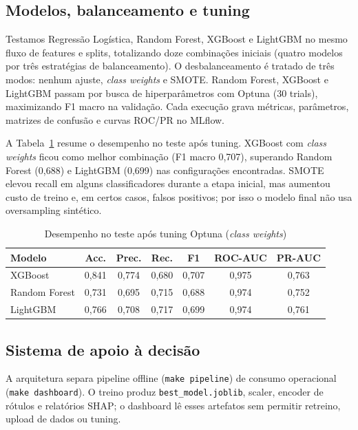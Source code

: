 \documentclass[12pt]{article}
\begin{document}
\subsection{Modelos, balanceamento e tuning}

Testamos Regressão Logística, Random Forest, XGBoost e LightGBM no mesmo fluxo de features e splits, totalizando doze combinações iniciais (quatro modelos por três estratégias de balanceamento).
O desbalanceamento é tratado de três modos: nenhum ajuste, \textit{class weights} e SMOTE.
Random Forest, XGBoost e LightGBM passam por busca de hiperparâmetros com Optuna (30 trials), maximizando F1 macro na validação.
Cada execução grava métricas, parâmetros, matrizes de confusão e curvas ROC/PR no MLflow.

A Tabela~\ref{tab:tuning} resume o desempenho no teste após tuning.
XGBoost com \textit{class weights} ficou como melhor combinação (F1 macro 0,707), superando Random Forest (0,688) e LightGBM (0,699) nas configurações encontradas.
SMOTE elevou recall em alguns classificadores durante a etapa inicial, mas aumentou custo de treino e, em certos casos, falsos positivos; por isso o modelo final não usa oversampling sintético.

\begin{table}[ht]
\centering
\caption{Desempenho no teste após tuning Optuna (\textit{class weights})}
\label{tab:tuning}
\begin{tabular}{lcccccc}
\hline
Modelo & Acc. & Prec. & Rec. & F1 & ROC-AUC & PR-AUC \\
\hline
XGBoost & 0,841 & 0,774 & 0,680 & 0,707 & 0,975 & 0,763 \\
Random Forest & 0,731 & 0,695 & 0,715 & 0,688 & 0,974 & 0,752 \\
LightGBM & 0,766 & 0,708 & 0,717 & 0,699 & 0,974 & 0,761 \\
\hline
\end{tabular}
\end{table}

\subsection{Sistema de apoio à decisão}

A arquitetura separa pipeline offline (\texttt{make pipeline}) de consumo operacional (\texttt{make dashboard}).
O treino produz \texttt{best\_model.joblib}, scaler, encoder de rótulos e relatórios SHAP; o dashboard lê esses artefatos sem permitir retreino, upload de dados ou tuning.
\end{document}
